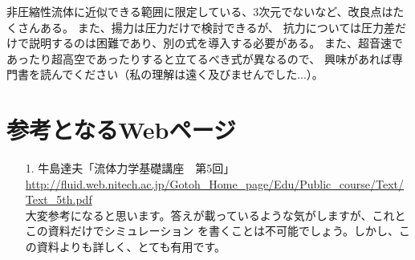\documentclass{article}
\begin{document}
非圧縮性流体に近似できる範囲に限定している、3次元でないなど、改良点はたくさんある。
また、揚力は圧力だけで検討できるが、
抗力については圧力差だけで説明するのは困難であり、別の式を導入する必要がある。
また、超音速であったり超高空であったりすると立てるべき式が異なるので、
興味があれば専門書を読んでください（私の理解は遠く及びませんでした...）。

\section{ 参考となるWebページ }

\begin{itemize}
\item[1.] 牛島達夫「流体力学基礎講座　第5回」\\ \url{http://fluid.web.nitech.ac.jp/Gotoh_Home_page/Edu/Public_course/Text/Text_5th.pdf}
       \\ 大変参考になると思います。答えが載っているような気がしますが、これとこの資料だけでシミュレーション
	      を書くことは不可能でしょう。しかし、この資料よりも詳しく、とても有用です。
\end{itemize}
\end{document}
